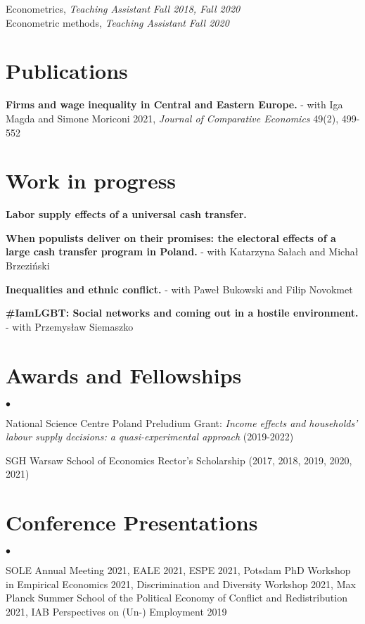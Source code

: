 \documentclass[margin,line]{res}
\newenvironment{list2}{
  \begin{list}{$\bullet$}{%
      \setlength{\itemsep}{0in}
      \setlength{\parsep}{0in} \setlength{\parskip}{0in}
      \setlength{\topsep}{0in} \setlength{\partopsep}{0in} 
      \setlength{\leftmargin}{0.2in}}}{\end{list}}
\begin{document}
\begin{resume}
\vspace{-.3cm}
Econometrics, \textit{Teaching Assistant} \hfill \textit{Fall 2018, Fall 2020}\\
Econometric methods, \textit{Teaching Assistant} \hfill \textit{Fall 2020}\\
\vspace*{.05in}  

\section{\sc Publications}
\textbf{Firms and wage inequality in Central and Eastern Europe.} - with Iga Magda and Simone Moriconi 2021, \textit{Journal of Comparative Economics} 49(2), 499-552
\vspace*{.05in}  
\section{\sc Work in progress}

\textbf{Labor supply effects of a universal cash transfer. }

\textbf{When populists deliver on their promises: the electoral effects of a large cash transfer program in Poland.} - with Katarzyna Sałach and Michał Brzeziński

\textbf{Inequalities and ethnic conflict.} - with Paweł Bukowski and Filip Novokmet

\textbf{\#IamLGBT: Social networks and coming out in a hostile environment.} - with Przemysław Siemaszko
\vspace*{.05in}  
\section{\sc Awards and Fellowships} 
\begin{list2}
\item National Science Centre Poland Preludium Grant: \textit{Income effects and households' labour supply decisions: a quasi-experimental approach} (2019-2022)
\item SGH Warsaw School of Economics Rector's Scholarship (2017, 2018, 2019, 2020, 2021)
\end{list2}
\vspace*{.05in} 
\section{\sc Conference Presentations} 
\begin{list2}
	\item SOLE Annual Meeting 2021, EALE 2021, ESPE 2021, Potsdam PhD Workshop in Empirical Economics 2021, Discrimination and Diversity Workshop 2021, Max Planck Summer School of the Political Economy of Conflict and Redistribution 2021, IAB Perspectives on (Un-) Employment 2019 
\end{list2}
\vspace*{.05in} 

\end{resume}
\end{document}
